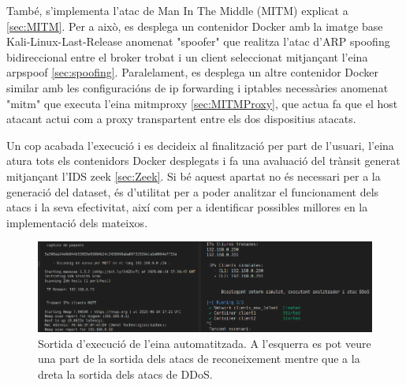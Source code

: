 També, s'implementa l'atac de Man In The Middle (MITM) explicat a \ref{sec:MITM}. Per a això, es desplega un contenidor Docker amb la imatge base Kali-Linux-Last-Release anomenat "spoofer" que realitza l'atac d'ARP spoofing bidireccional entre el broker trobat i un client seleccionat mitjançant l'eina arpspoof \ref{sec:spoofing}. Paralelament, es desplega un altre contenidor Docker similar amb les configuracións de ip forwarding i iptables necessàries anomenat "mitm" que executa l'eina mitmproxy \ref{sec:MITMProxy}, que actua fa que el host atacant actui com a proxy transpartent entre els dos dispositius atacats. 

Un cop acabada l'execució i es decideix al finalització per part de l'usuari, l'eina atura tots els contenidors Docker desplegats i fa una avaluació del trànsit generat mitjançant l'IDS zeek \ref{sec:Zeek}. Si bé aquest apartat no és necessari per a la generació del dataset, és d'utilitat per a poder analitzar el funcionament dels atacs i la seva efectivitat, així com per a identificar possibles millores en la implementació dels mateixos.

  \begin{figure}[H]
    \centering
    \includegraphics[width=1\textwidth]{img/tool.png}
    \caption{Sortida d'execució de l'eina automatitzada. A l'esquerra es pot veure una part de la sortida dels atacs de reconeixement mentre que a la dreta la sortida dels atacs de DDoS.}
    \label{fig:tool}
  \end{figure}
